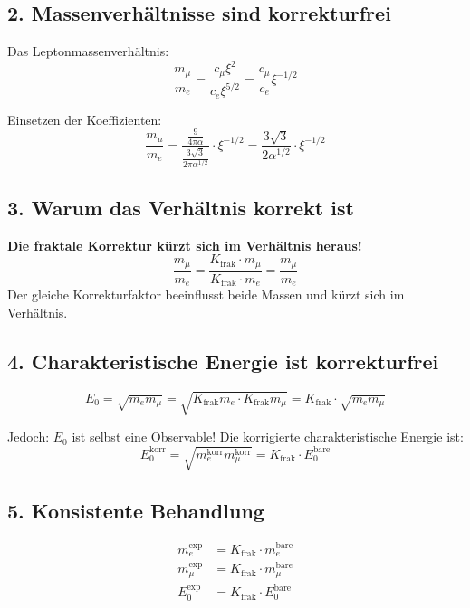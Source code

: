 \documentclass[12pt,a4paper]{article}
\begin{document}
\subsection{2. Massenverhältnisse sind korrekturfrei}

Das Leptonmassenverhältnis:
\[
\frac{m_\mu}{m_e} = \frac{c_\mu \xi^2}{c_e \xi^{5/2}} = \frac{c_\mu}{c_e} \xi^{-1/2}
\]

Einsetzen der Koeffizienten:
\[
\frac{m_\mu}{m_e} = \frac{\frac{9}{4\pi\alpha}}{\frac{3\sqrt{3}}{2\pi\alpha^{1/2}}} \cdot \xi^{-1/2} = \frac{3\sqrt{3}}{2\alpha^{1/2}} \cdot \xi^{-1/2}
\]

\subsection{3. Warum das Verhältnis korrekt ist}

\begin{tcolorbox}[colback=green!5!white,colframe=green!75!black]
	\textbf{Die fraktale Korrektur kürzt sich im Verhältnis heraus!}
	\[
	\frac{m_\mu}{m_e} = \frac{K_{\text{frak}} \cdot m_\mu}{K_{\text{frak}} \cdot m_e} = \frac{m_\mu}{m_e}
	\]
	Der gleiche Korrekturfaktor beeinflusst beide Massen und kürzt sich im Verhältnis.
\end{tcolorbox}

\subsection{4. Charakteristische Energie ist korrekturfrei}

\[
E_0 = \sqrt{m_e m_\mu} = \sqrt{K_{\text{frak}} m_e \cdot K_{\text{frak}} m_\mu} = K_{\text{frak}} \cdot \sqrt{m_e m_\mu}
\]

Jedoch: $E_0$ ist selbst eine Observable! Die korrigierte charakteristische Energie ist:
\[
E_0^{\text{korr}} = \sqrt{m_e^{\text{korr}} m_\mu^{\text{korr}}} = K_{\text{frak}} \cdot E_0^{\text{bare}}
\]

\subsection{5. Konsistente Behandlung}

\begin{align*}
	m_e^{\text{exp}} &= K_{\text{frak}} \cdot m_e^{\text{bare}} \\
	m_\mu^{\text{exp}} &= K_{\text{frak}} \cdot m_\mu^{\text{bare}} \\
	E_0^{\text{exp}} &= K_{\text{frak}} \cdot E_0^{\text{bare}}
\end{align*}
\end{document}
